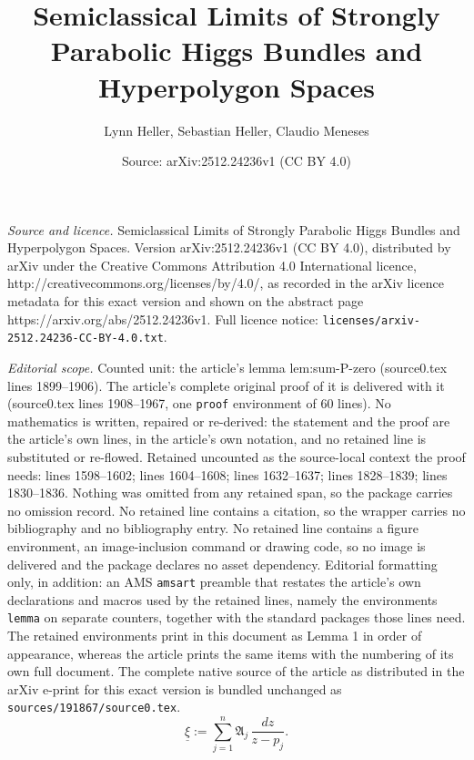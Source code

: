\documentclass[10pt,a4paper]{amsart}
\title{Semiclassical Limits of Strongly Parabolic Higgs Bundles and Hyperpolygon Spaces}
\author{Lynn Heller, Sebastian Heller, Claudio Meneses}
\date{Source: arXiv:2512.24236v1 (CC BY 4.0)}
\begin{document}
\maketitle

\noindent\emph{Source and licence.} Semiclassical Limits of Strongly Parabolic Higgs Bundles and Hyperpolygon Spaces. Version arXiv:2512.24236v1 (CC BY 4.0), distributed by arXiv under the Creative Commons Attribution 4.0 International licence, http://creativecommons.org/licenses/by/4.0/, as recorded in the arXiv licence metadata for this exact version and shown on the abstract page https://arxiv.org/abs/2512.24236v1. Full licence notice: \texttt{licenses/arxiv-2512.24236-CC-BY-4.0.txt}.\par\smallskip

\noindent\textit{Editorial scope.} Counted unit: the article's lemma lem:sum-P-zero (source0.tex lines 1899--1906). The article's complete original proof of it is delivered with it (source0.tex lines 1908--1967, one \texttt{proof} environment of 60 lines). No mathematics is written, repaired or re-derived: the statement and the proof are the article's own lines, in the article's own notation, and no retained line is substituted or re-flowed.  Retained uncounted as the source-local context the proof needs: lines 1598--1602; lines 1604--1608; lines 1632--1637; lines 1828--1839; lines 1830--1836.  Nothing was omitted from any retained span, so the package carries no omission record.  No retained line contains a citation, so the wrapper carries no bibliography and no bibliography entry.  No retained line contains a figure environment, an image-inclusion command or drawing code, so no image is delivered and the package declares no asset dependency.  Editorial formatting only, in addition: an AMS \texttt{amsart} preamble that restates the article's own declarations and macros used by the retained lines, namely the environments \texttt{lemma} on separate counters, together with the standard packages those lines need.  The retained environments print in this document as Lemma 1 in order of appearance, whereas the article prints the same items with the numbering of its own full document.  The complete native source of the article as distributed in the arXiv e-print for this exact version is bundled unchanged as \texttt{sources/191867/source0.tex}.
\begin{equation}\label{eq:xicentral}
\underline\xi
:=
\sum_{j=1}^n \mathfrak A_j\,\frac{dz}{z-p_j}.
\end{equation}
\end{document}
